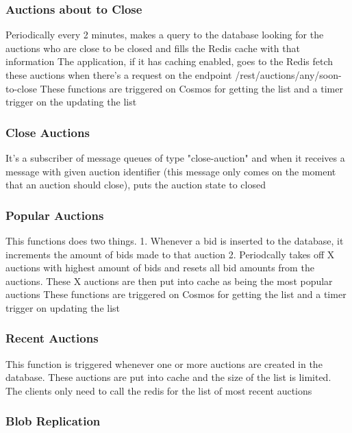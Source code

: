 \documentclass[runningheads]{llncs}
\begin{document}

\subsubsection{Auctions about to Close}

Periodically every 2 minutes, makes a query to the database looking for the auctions who are close to be closed and fills the Redis cache with that information
The application, if it has caching enabled, goes to the Redis fetch these auctions when there's a request on the endpoint /rest/auctions/any/soon-to-close
These functions are triggered on Cosmos for getting the list and a timer trigger on the updating the list

\subsubsection{Close Auctions}

It's a subscriber of message queues of type "close-auction" and when it receives a message with given auction identifier (this message only comes on the moment that an auction should close), puts the auction state to closed

\subsubsection{Popular Auctions}

This functions does two things.
1. Whenever a bid is inserted to the database, it increments the amount of bids made to that auction
2. Periodcally takes off X auctions with highest amount of bids and resets all bid amounts from the auctions. These X auctions are then put into cache as being the most popular auctions
These functions are triggered on Cosmos for getting the list and a timer trigger on updating the list

\subsubsection{Recent Auctions}

This function is triggered whenever one or more auctions are created in the database.
These auctions are put into cache and the size of the list is limited. The clients only need to call the redis for the list of most recent auctions

\subsubsection{Blob Replication}
\end{document}
